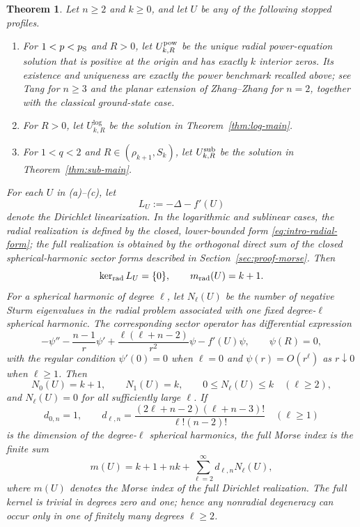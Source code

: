 \documentclass[11pt]{article}
\newtheorem{theorem}{Theorem}[section]
\begin{document}
\begin{theorem}\label{thm:morse-main}
Let $n\ge2$ and $k\ge0$, and let $U$ be any of the following stopped
profiles.
\begin{enumerate}[label=\textup{(\alph*)}]
\item For $1<p<p_{\rm S}$ and $R>0$, let
$U^{\rm pow}_{k,R}$ be the unique radial power-equation {solution} that is
positive at the origin and has exactly $k$ interior zeros. {Its existence
and uniqueness are exactly the power benchmark recalled above; see Tang
\cite{Tang} for $n\ge3$ and the planar extension of Zhang--Zhang
\cite{ZhangZhang} for $n=2$, together with the classical ground-state case.}
\item For $R>0$, let $U^{\log}_{k,R}$ be the {solution} in
Theorem~\ref{thm:log-main}.
\item For $1<q<2$ and $R\in(\rho_{k+1},S_k)$, let
$U^{\rm sub}_{k,R}$ be the {solution} in Theorem~\ref{thm:sub-main}.
\end{enumerate}
For each $U$ in \textup{(a)}--\textup{(c)}, let
\[
 L_U:=-\Delta-f'(U)
\]
{denote the Dirichlet linearization. In the logarithmic and sublinear
cases, the radial realization is defined by the closed, lower-bounded form
\eqref{eq:intro-radial-form}; the full realization is obtained by the
orthogonal direct sum of the closed spherical-harmonic sector forms described
in Section~\ref{sec:proof-morse}.} Then
\begin{equation*}
 \ker_{\rm rad}L_U=\{0\},
 \qquad
 m_{\rm rad}(U)=k+1.
\end{equation*}
For a spherical harmonic of degree $\ell$, let $N_\ell(U)$ be the number of
{negative Sturm eigenvalues in the radial problem associated with one
fixed degree-$\ell$ spherical harmonic.  The corresponding sector operator
has differential expression}
\begin{equation*}
 -\psi''-\frac{n-1}{r}\psi'
 +\frac{\ell(\ell+n-2)}{r^2}\psi-f'(U)\psi,
 \qquad \psi(R)=0,
\end{equation*}
with the {regular condition $\psi'(0)=0$ when $\ell=0$ and
$\psi(r)=O(r^\ell)$ as $r\downarrow0$ when $\ell\ge1$}. Then
\begin{equation*}
 N_0(U)=k+1,
 \qquad N_1(U)=k,
 \qquad 0\le N_\ell(U)\le k\quad(\ell\ge2),
\end{equation*}
and $N_\ell(U)=0$ for all sufficiently large $\ell$. {If
\[
 d_{0,n}=1,
 \qquad
 d_{\ell,n}=\frac{(2\ell+n-2)(\ell+n-3)!}
 {\ell!(n-2)!}\quad(\ell\ge1)
\]
is the dimension of the degree-$\ell$ spherical harmonics, the full Morse
index is the finite sum
\begin{equation}\label{eq:main-full-morse}
 m(U)=k+1+nk+\sum_{\ell=2}^{\infty}d_{\ell,n}N_\ell(U),
\end{equation}
where $m(U)$ denotes the Morse index of the full Dirichlet realization.}
{The full kernel is trivial in degrees zero and one; hence any nonradial
degeneracy can occur only in one of finitely many degrees $\ell\ge2$.}
\end{theorem}
\end{document}
